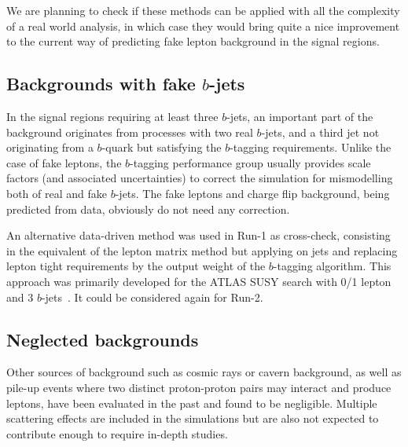We are planning to check if these methods can be applied with all the complexity of a real world analysis, 
in which case they would bring quite a nice improvement to the current way of predicting fake lepton background in the signal regions. 

\subsection{Backgrounds with fake $b$-jets}
\label{sec:bkg_bjetfakes}

In the signal regions requiring at least three $b$-jets, an important part of the background originates from processes 
with two real $b$-jets, and a third jet not originating from a $b$-quark but satisfying the $b$-tagging requirements. 
Unlike the case of fake leptons, the $b$-tagging performance group usually provides scale factors (and associated uncertainties) 
to correct the simulation for mismodelling both of real and fake $b$-jets. 
The fake leptons and charge flip background, being predicted from data, obviously do not need any correction. 

An alternative data-driven method was used in Run-1 as cross-check, 
consisting in the equivalent of the lepton matrix method but applying on jets 
and replacing lepton tight requirements by the output weight of the $b$-tagging algorithm. 
This approach was primarily developed for the ATLAS SUSY search with 0/1 lepton and 3 $b$-jets~\cite{SUSY3bjetsRun1}. 
It could be considered again for Run-2. 

\subsection{Neglected backgrounds}
\label{sec:bkg_neglected}
Other sources of background such as cosmic rays or cavern background, as well as pile-up events where two distinct proton-proton pairs may interact and produce leptons, 
have been evaluated in the past and found to be negligible. 
Multiple scattering effects are included in the simulations but are also not expected to contribute enough to require in-depth studies. 

